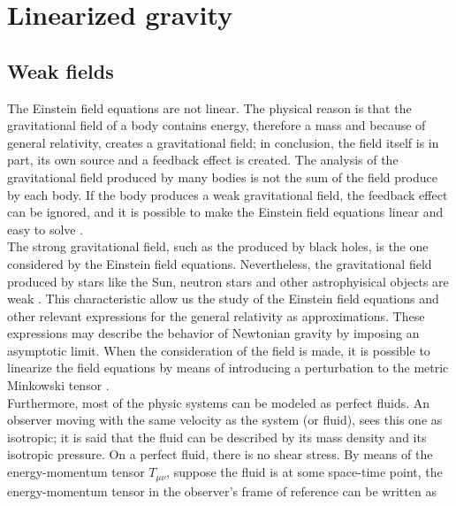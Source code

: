 \chapter{Linearized gravity } \label{ch: firstchapter} %

\section{Weak fields}
The Einstein field equations are not linear. The physical reason is that the gravitational field of a body contains energy, therefore a mass and because of general relativity, creates a gravitational field; in conclusion, the field itself is in part, its own source and a feedback effect is created. The analysis of the gravitational field produced by many bodies is not the sum of the field produce by each body. If the body produces a weak gravitational field, the feedback effect can be ignored, and it is possible to make the Einstein field equations linear and easy to solve \cite{Adler}.\\

The strong gravitational field, such as the produced by black holes, is the one considered by the Einstein field equations. Nevertheless, the gravitational field produced by stars like the Sun, neutron stars and other astrophyisical objects are weak \cite{GravityPoisson}. This characteristic allow us the study of the Einstein field equations and other relevant expressions for the general relativity as approximations. These expressions may describe the behavior of Newtonian gravity by imposing an asymptotic limit. When the consideration of the field is made, it is possible to linearize the field equations by means of introducing a perturbation to the metric Minkowski tensor \cite{Larranaga}. \\

Furthermore, most of the physic systems can be modeled as perfect fluids. An observer moving with the same velocity as the system (or fluid), sees this one as isotropic; it is said that the fluid can be described by its mass density and its isotropic pressure. On a perfect fluid, there is no shear stress. By means of the energy-momentum tensor $T_{\mu\nu}$, suppose the fluid is at some space-time point, the energy-momentum tensor in the observer's frame of reference can be written as

